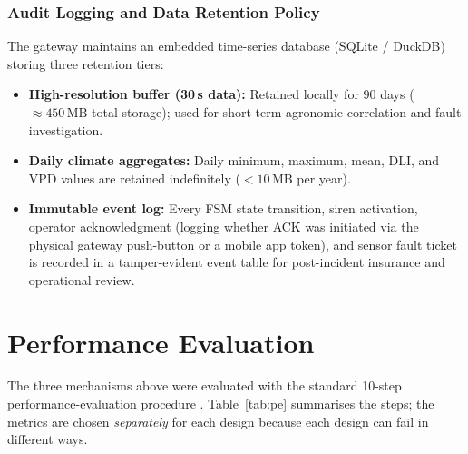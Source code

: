 \documentclass[11pt,a4paper]{report}
\begin{document}
\subsection{Audit Logging and Data Retention Policy}
The gateway maintains an embedded time-series database (SQLite / DuckDB) storing three retention tiers:
\begin{itemize}[noitemsep]
  \item \textbf{High-resolution buffer (30\,s data):} Retained locally for 90 days ($\approx 450\,\text{MB}$ total storage); used for short-term agronomic correlation and fault investigation.
  \item \textbf{Daily climate aggregates:} Daily minimum, maximum, mean, DLI, and VPD values are retained indefinitely ($< 10\,\text{MB}$ per year).
  \item \textbf{Immutable event log:} Every FSM state transition, siren activation, operator acknowledgment (logging whether ACK was initiated via the physical gateway push-button or a mobile app token), and sensor fault ticket is recorded in a tamper-evident event table for post-incident insurance and operational review.
\end{itemize}

\chapter{Performance Evaluation}\label{ch:pe}
The three mechanisms above were evaluated with the standard 10-step performance-evaluation procedure \cite{jain,pe}. Table~\ref{tab:pe} summarises the steps; the metrics are chosen \emph{separately} for each design because each design can fail in different ways.
\end{document}
